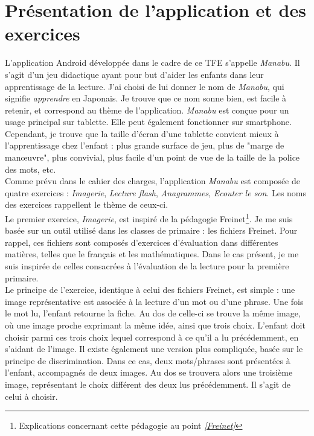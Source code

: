 \section{Présentation de l'application et des exercices}
L'application Android développée dans le cadre de ce TFE s'appelle \textit{Manabu}. Il s'agit d'un jeu didactique ayant pour but d'aider les enfants dans leur apprentissage de la lecture. J'ai choisi de lui donner le nom de \textit{Manabu}, qui signifie \textit{apprendre} en Japonais. Je trouve que ce nom sonne bien, est facile à retenir, et correspond au thème de l'application. 
\textit{Manabu} est conçue pour un usage principal sur tablette. Elle peut également fonctionner sur smartphone. Cependant, je trouve que la taille d'écran d'une tablette convient mieux à l'apprentissage chez l'enfant : plus grande surface de jeu, plus de "marge de manœuvre", plus convivial, plus facile d'un point de vue de la taille de la police des mots, etc.\\

Comme prévu dans le cahier des charges, l'application \textit{Manabu} est composée de quatre exercices : \textit{Imagerie}, \textit{Lecture flash}, \textit{Anagrammes}, \textit{Ecouter le son}. Les noms des exercices rappellent le thème de ceux-ci.\\

Le premier exercice, \textit{Imagerie}, est inspiré de la pédagogie Freinet\footnote{Explications concernant cette pédagogie au point \textit{\ref{Freinet}}}. Je me suis basée sur un outil utilisé dans les classes de primaire : les fichiers Freinet. Pour rappel, ces fichiers sont composés d'exercices d'évaluation dans différentes matières, telles que le français et les mathématiques. Dans le cas présent, je me suis inspirée de celles consacrées à l'évaluation de la lecture pour la première primaire.\\

Le principe de l'exercice, identique à celui des fichiers Freinet, est simple : une image représentative est associée à la lecture d'un mot ou d'une phrase. Une fois le mot lu, l'enfant retourne la fiche. Au dos de celle-ci se trouve la même image, où une image proche exprimant la même idée, ainsi que trois choix. L'enfant doit choisir parmi ces trois choix lequel correspond à ce qu'il a lu précédemment, en s'aidant de l'image. Il existe également une version plus compliquée, basée sur le principe de discrimination. Dans ce cas, deux mots/phrases sont présentées à l'enfant, accompagnés de deux images. Au dos se trouvera alors une troisième image, représentant le choix différent des deux lus précédemment. Il s'agit de celui à choisir.\\

